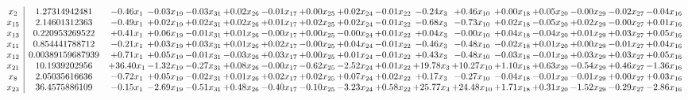 \documentclass[9pt]{article}
\begin{document}
 \[\begin{array}{c| c c@{\hskip 2pt} c@{\hskip 2pt} c@{\hskip 2pt} c@{\hskip 2pt} c@{\hskip 2pt} c@{\hskip 2pt} c@{\hskip 2pt} c@{\hskip 2pt} c@{\hskip 2pt} c@{\hskip 2pt} c@{\hskip 2pt} c@{\hskip 2pt} c@{\hskip 2pt} c@{\hskip 2pt} c@{\hskip 2pt} }
 x_{2}   &  1.27314942481 & -0.46 x_{1} & -0.03 x_{19} & -0.03 x_{31} & +  0.02 x_{26} & -0.01 x_{17} & +  0.00 x_{25} & +  0.02 x_{24} & -0.01 x_{22} & -0.24 x_{3} & +  0.46 x_{10} & +  0.00 x_{18} & +  0.05 x_{20} & -0.00 x_{29} & -0.02 x_{27} & -0.04 x_{16}\\
 x_{15}   &  2.14601312363 & -0.49 x_{1} & +  0.02 x_{19} & +  0.02 x_{31} & +  0.02 x_{26} & +  0.01 x_{17} & +  0.02 x_{25} & +  0.02 x_{24} & -0.01 x_{22} & -0.68 x_{3} & -0.73 x_{10} & +  0.02 x_{18} & -0.05 x_{20} & +  0.02 x_{29} & -0.00 x_{27} & +  0.01 x_{16}\\
 x_{13}   &  0.220953269522 & +  0.41 x_{1} & +  0.06 x_{19} & -0.01 x_{31} & +  0.01 x_{26} & -0.00 x_{17} & +  0.00 x_{25} & -0.00 x_{24} & +  0.01 x_{22} & +  0.04 x_{3} & -0.00 x_{10} & +  0.04 x_{18} & -0.04 x_{20} & +  0.01 x_{29} & +  0.03 x_{27} & +  0.05 x_{16}\\
 x_{11}   &  0.854441788712 & -0.21 x_{1} & +  0.03 x_{19} & +  0.03 x_{31} & +  0.01 x_{26} & +  0.02 x_{17} & -0.00 x_{25} & +  0.04 x_{24} & -0.01 x_{22} & -0.46 x_{3} & -0.48 x_{10} & -0.02 x_{18} & +  0.01 x_{20} & +  0.00 x_{29} & -0.01 x_{27} & +  0.04 x_{16}\\
 x_{12}   &  0.00389159687939 & +  0.71 x_{1} & +  0.05 x_{19} & -0.01 x_{31} & -0.03 x_{26} & +  0.03 x_{17} & +  0.00 x_{25} & +  0.01 x_{24} & -0.01 x_{22} & +  0.43 x_{3} & -0.48 x_{10} & -0.03 x_{18} & -0.01 x_{20} & +  0.03 x_{29} & +  0.03 x_{27} & +  0.05 x_{16}\\
 x_{21}   &  10.1939202956 & + 36.40 x_{1} & -1.32 x_{19} & -0.27 x_{31} & +  0.08 x_{26} & -0.00 x_{17} & -0.62 x_{25} & -2.52 x_{24} & +  0.01 x_{22} & + 19.78 x_{3} & + 10.27 x_{10} & +  1.10 x_{18} & +  0.63 x_{20} & -0.54 x_{29} & +  0.46 x_{27} & -1.36 x_{16}\\
 x_{8}   &  2.05035616636 & -0.72 x_{1} & +  0.05 x_{19} & -0.02 x_{31} & +  0.01 x_{26} & +  0.02 x_{17} & +  0.02 x_{25} & +  0.07 x_{24} & +  0.02 x_{22} & +  0.17 x_{3} & -0.27 x_{10} & -0.04 x_{18} & -0.01 x_{20} & -0.01 x_{29} & +  0.00 x_{27} & +  0.03 x_{16}\\
 x_{23}   &  36.4575886109 & -0.15 x_{1} & -2.69 x_{19} & -0.51 x_{31} & +  0.48 x_{26} & -0.40 x_{17} & -0.10 x_{25} & -3.23 x_{24} & +  0.58 x_{22} & + 25.77 x_{3} & + 24.48 x_{10} & +  1.71 x_{18} & +  0.31 x_{20} & -1.52 x_{29} & -0.29 x_{27} & -2.86 x_{16}\\

\end{array}\]
\end{document}

